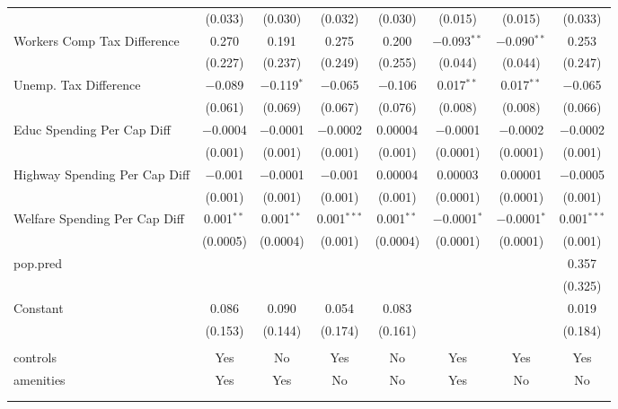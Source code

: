 \begin{table}[!htbp]
\begin{tabular}{@{\extracolsep{5pt}}lccccccc}
  & (0.033) & (0.030) & (0.032) & (0.030) & (0.015) & (0.015) & (0.033) \\ 
  Workers Comp Tax Difference & 0.270 & 0.191 & 0.275 & 0.200 & $-$0.093$^{**}$ & $-$0.090$^{**}$ & 0.253 \\ 
  & (0.227) & (0.237) & (0.249) & (0.255) & (0.044) & (0.044) & (0.247) \\ 
  Unemp. Tax Difference & $-$0.089 & $-$0.119$^{*}$ & $-$0.065 & $-$0.106 & 0.017$^{**}$ & 0.017$^{**}$ & $-$0.065 \\ 
  & (0.061) & (0.069) & (0.067) & (0.076) & (0.008) & (0.008) & (0.066) \\ 
  Educ Spending Per Cap Diff & $-$0.0004 & $-$0.0001 & $-$0.0002 & 0.00004 & $-$0.0001 & $-$0.0002 & $-$0.0002 \\ 
  & (0.001) & (0.001) & (0.001) & (0.001) & (0.0001) & (0.0001) & (0.001) \\ 
  Highway Spending Per Cap Diff & $-$0.001 & $-$0.0001 & $-$0.001 & 0.00004 & 0.00003 & 0.00001 & $-$0.0005 \\ 
  & (0.001) & (0.001) & (0.001) & (0.001) & (0.0001) & (0.0001) & (0.001) \\ 
  Welfare Spending Per Cap Diff & 0.001$^{**}$ & 0.001$^{**}$ & 0.001$^{***}$ & 0.001$^{**}$ & $-$0.0001$^{*}$ & $-$0.0001$^{*}$ & 0.001$^{***}$ \\ 
  & (0.0005) & (0.0004) & (0.001) & (0.0004) & (0.0001) & (0.0001) & (0.001) \\ 
  pop.pred &  &  &  &  &  &  & 0.357 \\ 
  &  &  &  &  &  &  & (0.325) \\ 
  Constant & 0.086 & 0.090 & 0.054 & 0.083 &  &  & 0.019 \\ 
  & (0.153) & (0.144) & (0.174) & (0.161) &  &  & (0.184) \\ 
 \hline \\[-1.8ex] 
controls & Yes & No & Yes & No & Yes & Yes & Yes \\ 
amenities & Yes & Yes & No & No & Yes & No & No \\ 
\hline \\[-1.8ex] 
\hline 
\hline \\[-1.8ex] 
\end{tabular} 
\end{table} 
